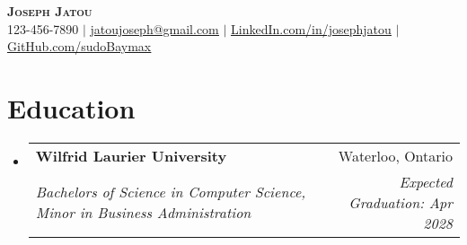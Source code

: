 \documentclass[letterpaper,11pt]{article}
\makeatletter
\newcommand{\resumeSubheading}[4]{
  \vspace{-2pt}\item
    \begin{tabular*}{0.97\textwidth}[t]{l@{\extracolsep{\fill}}r}
      \textbf{#1} & #2 \\
      \textit{\small#3} & \textit{\small #4} \\
    \end{tabular*}\vspace{-7pt}
}
\newcommand{\resumeSubHeadingListStart}{\begin{itemize}[leftmargin=0.15in, label={}]}
\newcommand{\resumeSubHeadingListEnd}{\end{itemize}}
\makeatother
\begin{document}
\begin{center}
    \textbf{\Huge \scshape Joseph Jatou} \\ \vspace{1pt}
    \small 123-456-7890 $|$ \href{mailto:jatoujoseph@gmail.com}{\underline{jatoujoseph@gmail.com}} $|$ 
    \href{https://linkedin.com/in/josephjatou}{\underline{LinkedIn.com/in/josephjatou}} $|$
    \href{https://github.com/sudoBaymax}{\underline{GitHub.com/sudoBaymax}}
\end{center}

\section{Education}
  \resumeSubHeadingListStart
    \resumeSubheading
      {Wilfrid Laurier University}{Waterloo, Ontario}
      {Bachelors of Science in Computer Science, Minor in Business Administration}{Expected Graduation: Apr 2028}
  \resumeSubHeadingListEnd

\end{document}
